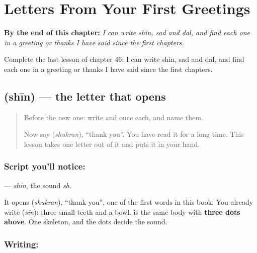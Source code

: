 
\chapter{Letters From Your First Greetings}
\label{ch:ar-letters-from-greetings}

\begin{chapteropening}
\textbf{By the end of this chapter:} \emph{I can write shin, sad and dal, and find each one in a greeting or thanks I have said since the first chapters.}

Complete the last lesson of chapter 46: I can write shin, sad and dal, and find each one in a greeting or thanks I have said since the first chapters.
\end{chapteropening}

\section[\texorpdfstring{\ar{ش} (shīn)}{ش (shīn)}]{ (shīn) — the letter that opens }

\label{lesson:AR-W46-shin}



\begin{quote}
Before the new one: write  and  once each, and name them.

Now say \textbf{} (\emph{shukran}), \textquotedblleft{}thank you\textquotedblright{}. You have read it for a long time. This lesson takes one letter out of it and puts it in your hand.
\end{quote}

\subsection*{Script you'll notice: }
\textbf{} — \emph{shīn}, the sound \emph{sh}.

It opens \textbf{} (\emph{shukran}), \textquotedblleft{}thank you\textquotedblright{}, one of the first words in this book. You already write \textbf{} (\emph{sīn}): three small teeth and a bowl. \textbf{} is the same body with \textbf{three dots above}. One skeleton, and the dots decide the sound.

\subsection*{Writing: }


